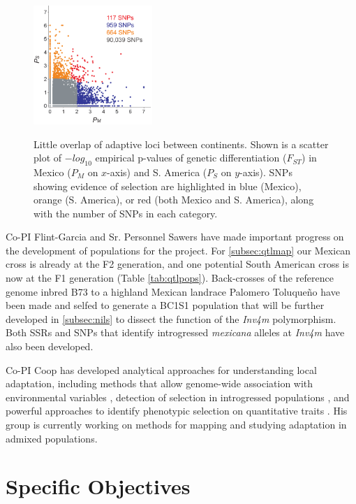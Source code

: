 \begin{figure}
  \centering \label{fig:fst}
   \includegraphics[width=0.4\textwidth]{fst.pdf}
  \caption{Little overlap of adaptive loci between continents. Shown is a scatter plot of $-log_{10}$ empirical p-values of genetic differentiation ($F_{ST}$) in Mexico ($P_M$ on $x$-axis) and S. America ($P_S$ on $y$-axis).  SNPs showing evidence of selection are highlighted in blue (Mexico), orange (S. America), or red (both Mexico and S. America), along with the number of SNPs in each category.} 
\end{figure}

Co-PI Flint-Garcia and Sr. Personnel Sawers have made important progress on the development of populations for the project. For \ref{subsec:qtlmap} our Mexican cross is already at the F2 generation, and one potential South American cross is now at the F1 generation  (Table \ref{tab:qtlpops}).  Back-crosses of the reference genome inbred B73 to a highland Mexican landrace Palomero Toluque\~no have been made and selfed to generate a BC1S1 population that will be further developed in \ref{subsec:nils} to dissect the function of the \emph{Inv4m} polymorphism. Both SSRs and SNPs that identify introgressed  \emph{mexicana} alleles at \emph{Inv4m} have also been developed.

Co-PI Coop has developed analytical approaches for understanding local adaptation, including methods that allow genome-wide association with environmental variables \citep{Coop2010, gunther2013robust}, detection of selection in introgressed populations \citep{Brandvain2013}, and powerful approaches to identify phenotypic selection on quantitative traits \cite{Berg2013}.  His group is currently working on methods for mapping and studying adaptation in admixed populations.

\section*{Specific Objectives}

